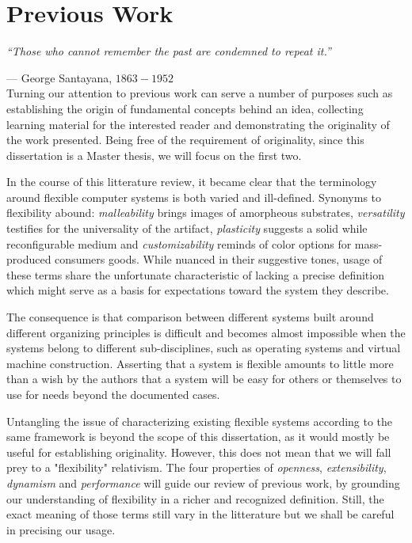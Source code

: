\chapter{Previous Work}
\emph{``Those who cannot remember the past are condemned to repeat it.''} 

--- George Santayana, $1863-1952$ \\

Turning our attention to previous work can serve a number of purposes such as
establishing the origin of fundamental concepts behind an idea,
collecting learning material for the interested reader and demonstrating the
originality of the work presented. Being free of the requirement of
originality, since this dissertation is a Master thesis, we will focus on the
first two.

In the course of this litterature review, it became clear that the
terminology around flexible computer systems is both varied and ill-defined.
Synonyms to flexibility abound: \textit{malleability} brings images of
amorpheous substrates, \textit{versatility} testifies for the universality of
the artifact, \textit{plasticity} suggests a solid while reconfigurable medium
and \textit{customizability} reminds of color options for mass-produced
consumers goods. While nuanced in their suggestive tones, usage of these terms
share the unfortunate characteristic of lacking a precise definition which
might serve as a basis for expectations toward the system they describe.

The consequence is that comparison between different systems built around
different organizing principles is difficult and becomes almost impossible when
the systems belong to different sub-disciplines, such as operating systems and
virtual machine construction. Asserting that a system is flexible amounts to
little more than a wish by the authors that a system will be easy for others or
themselves to use for needs beyond the documented cases.  

Untangling the issue of characterizing existing flexible systems according to
the same framework is beyond the scope of this dissertation, as it would mostly
be useful for establishing originality. However, this does not mean that we
will fall prey to a "flexibility" relativism. The four properties of
\textit{openness}, \textit{extensibility}, \textit{dynamism} and
\textit{performance} will guide our review of previous work, by grounding our
understanding of flexibility in a richer and recognized definition. Still, the
exact meaning of those terms still vary in the litterature but we shall be
careful in precising our usage.


